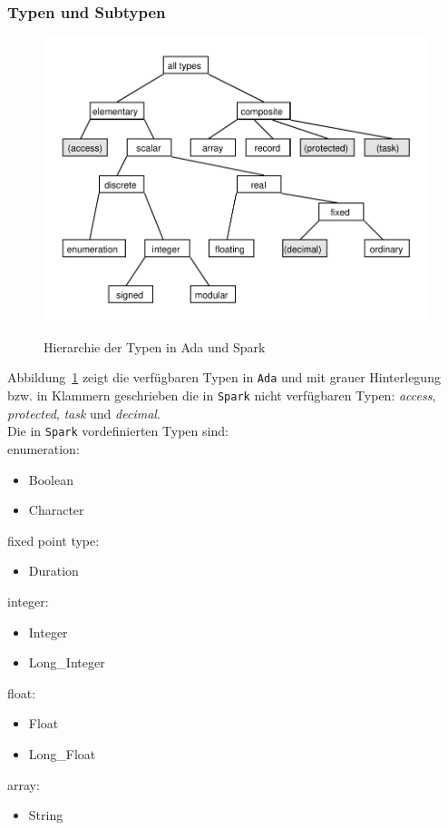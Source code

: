 \newpage

\subsubsection{Typen und Subtypen}
\label{subsubsec:TypenUndSubtypen}

\begin{figure}[h!]
\includegraphics[width=\textwidth{}]{images/typeHierarchy.pdf}
\label{fig:typeHierarchy}
\caption{Hierarchie der Typen in Ada und Spark}
\end{figure}

Abbildung~\ref{fig:typeHierarchy} zeigt die verfügbaren Typen in \texttt{Ada} und mit grauer Hinterlegung bzw. in Klammern geschrieben die in \texttt{Spark} nicht verfügbaren Typen: \textit{access}, \textit{protected}, \textit{task} und \textit{decimal}.\\
Die in \texttt{Spark} vordefinierten Typen sind:\\
enumeration:
\begin{itemize}
	\item Boolean
	\item Character
\end{itemize}
fixed point type:
\begin{itemize}
	\item Duration
\end{itemize}
integer:
\begin{itemize}
	\item Integer
	\item Long\_Integer
\end{itemize}
float:
\begin{itemize}
	\item Float
	\item Long\_Float
\end{itemize}
array:
\begin{itemize}
	\item String
\end{itemize}

